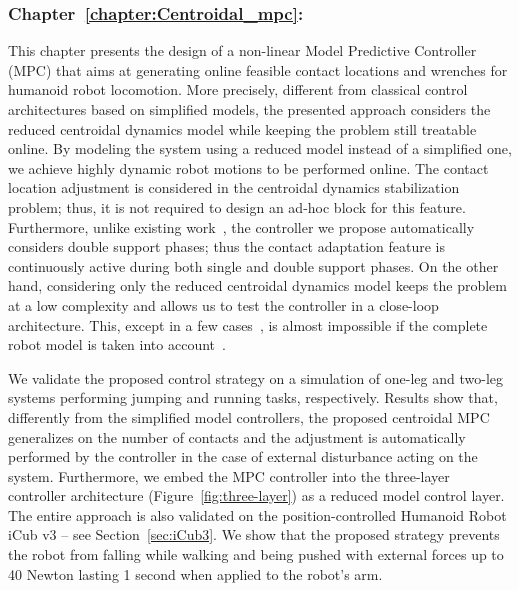 \subsubsection{Chapter~\ref{chapter:Centroidal_mpc}: }
This chapter presents the design of a non-linear Model Predictive Controller (MPC) that aims at generating online feasible contact locations and wrenches for humanoid robot locomotion. More precisely, different from classical control architectures based on simplified models, the presented approach considers the reduced centroidal dynamics model while keeping the problem still treatable online. By modeling the system using a reduced model instead of a simplified one, we achieve highly dynamic robot motions to be performed online. The contact location adjustment is considered in the centroidal dynamics stabilization problem; thus, it is not required to design an ad-hoc block for this feature. Furthermore, unlike existing work~\citep{Shafiee-Ashtiani2017a,Jeong2019AStrategies}, the controller we propose automatically considers double support phases; thus the contact adaptation feature is continuously active during both single and double support phases. On the other hand, considering only the reduced centroidal dynamics model keeps the problem at a low complexity and allows us to test the controller in a close-loop architecture. This, except in a few cases~\citep{Dantec2022FirstFeedback,Dantec2021WholeTalos}, is almost impossible if the complete robot model is taken into account~\citep{Herzog2015TrajectoryControl,Fernbach2018CROC:Problem,Dafarra2016Torque-controlledRobot}.
\par
We validate the proposed control strategy on a simulation of one-leg and two-leg systems performing jumping and running tasks, respectively. Results show that, differently from the simplified model controllers, the proposed centroidal MPC generalizes on the number of contacts and the adjustment is automatically performed by the controller in the case of external disturbance acting on the system. Furthermore, we embed the MPC controller into the three-layer controller architecture (Figure~\ref{fig:three-layer}) as a reduced model control layer. The entire approach is also validated on the position-controlled Humanoid Robot iCub v3 -- see Section~\ref{sec:iCub3}. We show that the proposed strategy prevents the robot from falling while walking and being pushed with external forces up to 40 Newton lasting 1 second when applied to the robot's arm.
